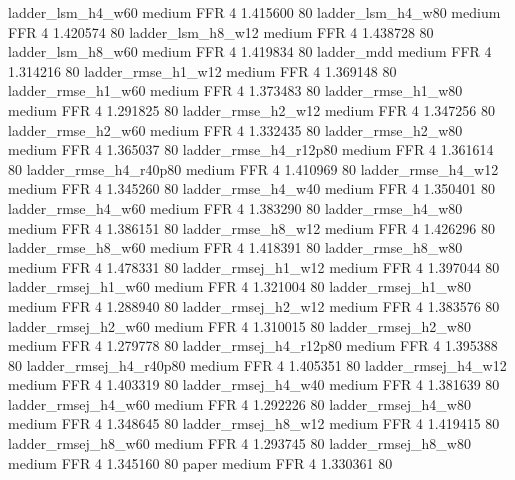      ladder_lsm_h4_w60     medium      FFR                 4 1.415600 80
     ladder_lsm_h4_w80     medium      FFR                 4 1.420574 80
     ladder_lsm_h8_w12     medium      FFR                 4 1.438728 80
     ladder_lsm_h8_w60     medium      FFR                 4 1.419834 80
            ladder_mdd     medium      FFR                 4 1.314216 80
    ladder_rmse_h1_w12     medium      FFR                 4 1.369148 80
    ladder_rmse_h1_w60     medium      FFR                 4 1.373483 80
    ladder_rmse_h1_w80     medium      FFR                 4 1.291825 80
    ladder_rmse_h2_w12     medium      FFR                 4 1.347256 80
    ladder_rmse_h2_w60     medium      FFR                 4 1.332435 80
    ladder_rmse_h2_w80     medium      FFR                 4 1.365037 80
 ladder_rmse_h4_r12p80     medium      FFR                 4 1.361614 80
 ladder_rmse_h4_r40p80     medium      FFR                 4 1.410969 80
    ladder_rmse_h4_w12     medium      FFR                 4 1.345260 80
    ladder_rmse_h4_w40     medium      FFR                 4 1.350401 80
    ladder_rmse_h4_w60     medium      FFR                 4 1.383290 80
    ladder_rmse_h4_w80     medium      FFR                 4 1.386151 80
    ladder_rmse_h8_w12     medium      FFR                 4 1.426296 80
    ladder_rmse_h8_w60     medium      FFR                 4 1.418391 80
    ladder_rmse_h8_w80     medium      FFR                 4 1.478331 80
   ladder_rmsej_h1_w12     medium      FFR                 4 1.397044 80
   ladder_rmsej_h1_w60     medium      FFR                 4 1.321004 80
   ladder_rmsej_h1_w80     medium      FFR                 4 1.288940 80
   ladder_rmsej_h2_w12     medium      FFR                 4 1.383576 80
   ladder_rmsej_h2_w60     medium      FFR                 4 1.310015 80
   ladder_rmsej_h2_w80     medium      FFR                 4 1.279778 80
ladder_rmsej_h4_r12p80     medium      FFR                 4 1.395388 80
ladder_rmsej_h4_r40p80     medium      FFR                 4 1.405351 80
   ladder_rmsej_h4_w12     medium      FFR                 4 1.403319 80
   ladder_rmsej_h4_w40     medium      FFR                 4 1.381639 80
   ladder_rmsej_h4_w60     medium      FFR                 4 1.292226 80
   ladder_rmsej_h4_w80     medium      FFR                 4 1.348645 80
   ladder_rmsej_h8_w12     medium      FFR                 4 1.419415 80
   ladder_rmsej_h8_w60     medium      FFR                 4 1.293745 80
   ladder_rmsej_h8_w80     medium      FFR                 4 1.345160 80
                 paper     medium      FFR                 4 1.330361 80
